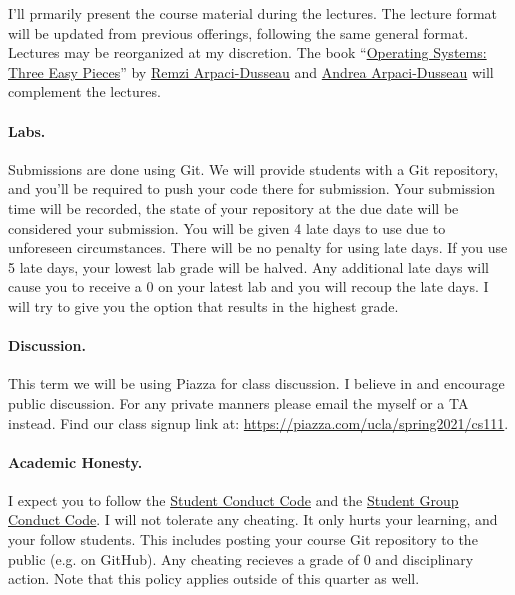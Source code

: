 \documentclass[12pt]{article}
\begin{document}
I'll prmarily present the course material during the lectures.
The lecture format will be updated from previous offerings, following the same
general format.
Lectures may be reorganized at my discretion.
The book
``\href{https://pages.cs.wisc.edu/~remzi/OSTEP/}
       {Operating Systems: Three Easy Pieces}''
by \href{http://www.cs.wisc.edu/~remzi}{Remzi Arpaci-Dusseau}
and \href{http://www.cs.wisc.edu/~dusseau}{Andrea Arpaci-Dusseau}
will complement the lectures.

\paragraph{Labs.}

Submissions are done using Git.
We will provide students with a Git repository, and you'll be required to
push your code there for submission.
Your submission time will be recorded, the state of your repository at the due
date will be considered your submission.
You will be given 4 late days to use due to unforeseen circumstances.
There will be no penalty for using late days.
If you use 5 late days, your lowest lab grade will be halved.
Any additional late days will cause you to receive a 0 on your latest lab and
you will recoup the late days.
I will try to give you the option that results in the highest grade.

\paragraph{Discussion.}

This term we will be using Piazza for class discussion.
I believe in and encourage public discussion.
For any private manners please email the myself or a TA instead.
Find our class signup link at: \url{https://piazza.com/ucla/spring2021/cs111}.

\paragraph{Academic Honesty.}

I expect you to follow the
\href{https://deanofstudents.ucla.edu/individual-student-code}
     {Student Conduct Code}
and the
\href{https://deanofstudents.ucla.edu/group-student-code}
     {Student Group Conduct Code}.
I will not tolerate any cheating.
It only hurts your learning, and your follow students.
This includes posting your course Git repository to the public
(e.g. on GitHub).
Any cheating recieves a grade of 0 and disciplinary action.
Note that this policy applies outside of this quarter as well.
\end{document}
